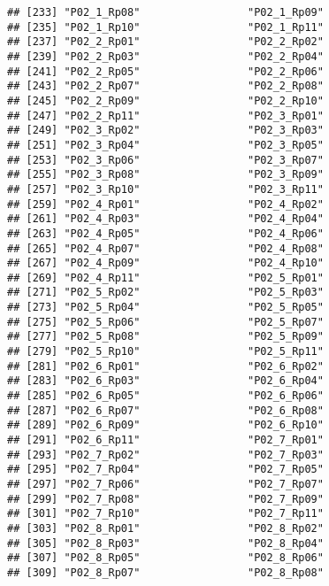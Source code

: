 \documentclass[
]{article}
\begin{document}
\begin{verbatim}
## [233] "P02_1_Rp08"                 "P02_1_Rp09"                
## [235] "P02_1_Rp10"                 "P02_1_Rp11"                
## [237] "P02_2_Rp01"                 "P02_2_Rp02"                
## [239] "P02_2_Rp03"                 "P02_2_Rp04"                
## [241] "P02_2_Rp05"                 "P02_2_Rp06"                
## [243] "P02_2_Rp07"                 "P02_2_Rp08"                
## [245] "P02_2_Rp09"                 "P02_2_Rp10"                
## [247] "P02_2_Rp11"                 "P02_3_Rp01"                
## [249] "P02_3_Rp02"                 "P02_3_Rp03"                
## [251] "P02_3_Rp04"                 "P02_3_Rp05"                
## [253] "P02_3_Rp06"                 "P02_3_Rp07"                
## [255] "P02_3_Rp08"                 "P02_3_Rp09"                
## [257] "P02_3_Rp10"                 "P02_3_Rp11"                
## [259] "P02_4_Rp01"                 "P02_4_Rp02"                
## [261] "P02_4_Rp03"                 "P02_4_Rp04"                
## [263] "P02_4_Rp05"                 "P02_4_Rp06"                
## [265] "P02_4_Rp07"                 "P02_4_Rp08"                
## [267] "P02_4_Rp09"                 "P02_4_Rp10"                
## [269] "P02_4_Rp11"                 "P02_5_Rp01"                
## [271] "P02_5_Rp02"                 "P02_5_Rp03"                
## [273] "P02_5_Rp04"                 "P02_5_Rp05"                
## [275] "P02_5_Rp06"                 "P02_5_Rp07"                
## [277] "P02_5_Rp08"                 "P02_5_Rp09"                
## [279] "P02_5_Rp10"                 "P02_5_Rp11"                
## [281] "P02_6_Rp01"                 "P02_6_Rp02"                
## [283] "P02_6_Rp03"                 "P02_6_Rp04"                
## [285] "P02_6_Rp05"                 "P02_6_Rp06"                
## [287] "P02_6_Rp07"                 "P02_6_Rp08"                
## [289] "P02_6_Rp09"                 "P02_6_Rp10"                
## [291] "P02_6_Rp11"                 "P02_7_Rp01"                
## [293] "P02_7_Rp02"                 "P02_7_Rp03"                
## [295] "P02_7_Rp04"                 "P02_7_Rp05"                
## [297] "P02_7_Rp06"                 "P02_7_Rp07"                
## [299] "P02_7_Rp08"                 "P02_7_Rp09"                
## [301] "P02_7_Rp10"                 "P02_7_Rp11"                
## [303] "P02_8_Rp01"                 "P02_8_Rp02"                
## [305] "P02_8_Rp03"                 "P02_8_Rp04"                
## [307] "P02_8_Rp05"                 "P02_8_Rp06"                
## [309] "P02_8_Rp07"                 "P02_8_Rp08"                

\end{verbatim}
\end{document}
